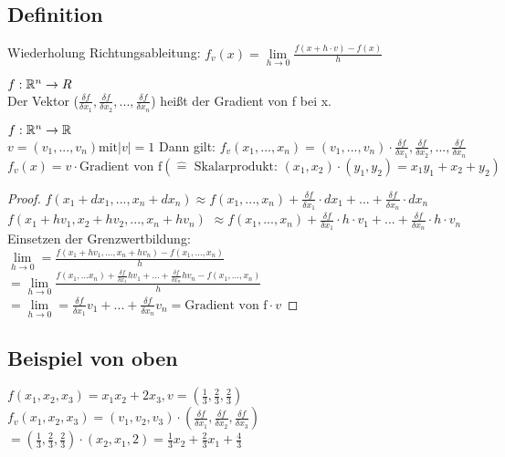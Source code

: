 \renewcommand{\ldate}{2015-10-08}

\subsection{Definition}
Wiederholung Richtungsableitung: $ f_v(x)=\lim\limits_{h\rightarrow 0} \frac{f(x+h\cdot v) - f(x)}{h}$
\begin{defi}
$ f: \mathbb{R}^n \rightarrow R $\\
Der Vektor ($ \frac{\delta f}{\delta x_1}, \frac{\delta f}{\delta x_2}, ..., \frac{\delta f}{\delta x_n} $) heißt der Gradient von f bei x.
\end{defi}

\begin{satz}
$ f: \mathbb{R}^n \rightarrow \mathbb{R} $\\
$ v = (v_1, ..., v_n) \textrm{mit} |v|=1 $
Dann gilt: $ f_v(x_1, ..., x_n) = (v_1, ..., v_n) \cdot \frac{\delta f}{\delta x_1}, \frac{\delta f}{\delta x_2}, ..., \frac{\delta f}{\delta x_n} $\\
$ f_v(x) = v \cdot \textrm{Gradient von f} (\widehat{=} \textrm{ Skalarprodukt: } (x_1,x_2)\cdot (y_1,y_2)=x_1y_1+x_2+y_2) $ 
\end{satz}


\begin{proof}
$ f(x_1+dx_1, ..., x_n+dx_n) \approx f(x_1, ..., x_n) + \frac{\delta f}{\delta x_1} \cdot dx_1 + ... + \frac{\delta f}{\delta x_n} \cdot dx_n  $\\
$ f(x_1+h v_1,x_2+h v_2, ..., x_n+h v_n) $
$ \approx f(x_1, ..., x_n) + \frac{\delta f}{\delta x_1} \cdot h\cdot v_1 + ... + \frac{\delta f}{\delta x_n} \cdot h\cdot v_n $\\
Einsetzen der Grenzwertbildung:\\
$ \lim\limits_{h\rightarrow 0} = \frac{f(x_1+hv_1,...,x_n+hv_n) - f(x_1, ..., x_n)}{h} $
$ = \lim\limits_{h\rightarrow 0} \frac{f(x_1,...x_n)+\frac{\delta f}{\delta x_1}hv_1 + ... + \frac{\delta f}{\delta x_n}hv_n - f(x_1, ..., x_n)}{h} $ 
$ = \lim\limits_{h\rightarrow 0} = \frac{\delta f}{\delta x_1} v_1 + ... + \frac{\delta f}{\delta x_n} v_n = \textrm{Gradient von f} \cdot v $
\end{proof}

\subsection{Beispiel von oben}
$ f(x_1,x_2,x_3) = x_1x_2 + 2x_3, v=(\frac{1}{3}, \frac{2}{3}, \frac{2}{3}) $\\
$ f_v(x_1,x_2,x_3)=(v_1,v_2,v_3)\cdot (\frac{\delta f}{\delta x_1}, \frac{\delta f}{\delta x_2}, \frac{\delta f}{\delta x_3}) $
$ = (\frac{1}{3}, \frac{2}{3}, \frac{2}{3})\cdot (x_2, x_1, 2) = \frac{1}{3} x_2 + \frac{2}{3} x_1 + \frac{4}{3} $

